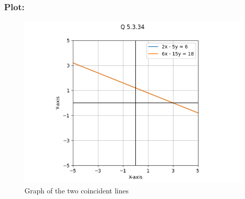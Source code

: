 \documentclass{beamer}
\begin{document}
\begin{frame}
    \frametitle{Plot: }
    \begin{figure}[h!]
        \centering
        \includegraphics[width=0.9\columnwidth]{../figs/plot.png}
        \caption{Graph of the two coincident lines}
        \label{fig:5.3.34}
    \end{figure}
\end{frame}
\end{document}
